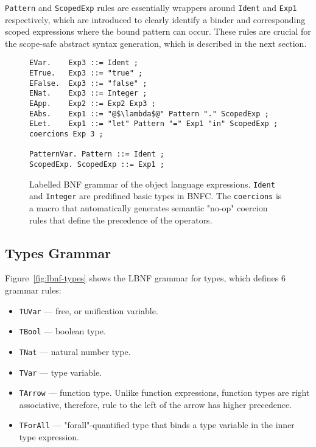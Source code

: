 \texttt{Pattern} and \texttt{ScopedExp} rules are essentially wrappers around \texttt{Ident} and \texttt{Exp1} respectively, which are introduced to clearly identify a binder and corresponding scoped expressions where the bound pattern can occur. These rules are crucial for the scope-safe abstract syntax generation, which is described in the next section.

\begin{figure}[H]
  \begin{verbatim}
EVar.    Exp3 ::= Ident ;
ETrue.   Exp3 ::= "true" ;
EFalse.  Exp3 ::= "false" ;
ENat.    Exp3 ::= Integer ;
EApp.    Exp2 ::= Exp2 Exp3 ;
EAbs.    Exp1 ::= "@$\lambda$@" Pattern "." ScopedExp ;
ELet.    Exp1 ::= "let" Pattern "=" Exp1 "in" ScopedExp ;
coercions Exp 3 ;

PatternVar. Pattern ::= Ident ;
ScopedExp. ScopedExp ::= Exp1 ;
  \end{verbatim}
  \caption[LBNF grammar of the object language expressions]{Labelled BNF grammar of the object language expressions. \texttt{Ident} and \texttt{Integer} are predifined basic types in BNFC. The \texttt{coercions} is a macro that automatically generates semantic "no-op" coercion rules that define the precedence of the operators.}
  \label{fig:lbnf-terms}
\end{figure}


\subsection{Types Grammar}

Figure~\ref{fig:lbnf-types} shows the LBNF grammar for types, which defines 6 grammar rules:

\begin{itemize}
  \item \texttt{TUVar} — free, or unification variable.
  \item \texttt{TBool} — boolean type.
  \item \texttt{TNat} — natural number type.
  \item \texttt{TVar} — type variable.
  \item \texttt{TArrow} — function type. Unlike function expressions, function types are right associative, therefore, rule to the left of the arrow has higher precedence.
  \item \texttt{TForAll} — "forall"-quantified type that binds a type variable in the inner type expression.
\end{itemize}


